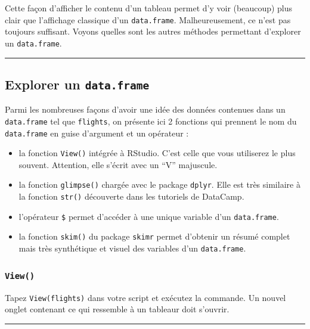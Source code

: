 \documentclass[a4paperpaper,]{article}
\providecommand{\tightlist}{%
  \setlength{\itemsep}{0pt}\setlength{\parskip}{0pt}}
\begin{document}
Cette façon d'afficher le contenu d'un tableau permet d'y voir (beaucoup) plus clair que l'affichage classique d'un \texttt{data.frame}. Malheureusement, ce n'est pas toujours suffisant. Voyons quelles sont les autres méthodes permettant d'explorer un \texttt{data.frame}.

\begin{center}\rule{0.5\linewidth}{\linethickness}\end{center}

\hypertarget{explorer-un-data.frame}{%
\subsection{\texorpdfstring{Explorer un \texttt{data.frame}}{Explorer un data.frame}}\label{explorer-un-data.frame}}

Parmi les nombreuses façons d'avoir une idée des données contenues dans un \texttt{data.frame} tel que \texttt{flights}, on présente ici 2 fonctions qui prennent le nom du \texttt{data.frame} en guise d'argument et un opérateur :

\begin{itemize}
\tightlist
\item
  la fonction \texttt{View()} intégrée à RStudio. C'est celle que vous utiliserez le plus souvent. Attention, elle s'écrit avec un ``V'' majuscule.
\item
  la fonction \texttt{glimpse()} chargée avec le package \texttt{dplyr}. Elle est très similaire à la fonction \texttt{str()} découverte dans les tutoriels de DataCamp.
\item
  l'opérateur \texttt{\$} permet d'accéder à une unique variable d'un \texttt{data.frame}.
\item
  la fonction \texttt{skim()} du package \texttt{skimr} permet d'obtenir un résumé complet mais très synthétique et visuel des variables d'un \texttt{data.frame}.
\end{itemize}

\hypertarget{View}{%
\subsubsection{\texorpdfstring{\texttt{View()}}{View()}}\label{View}}

Tapez \texttt{View(flights)} dans votre script et exécutez la commande. Un nouvel onglet contenant ce qui ressemble à un tableaur doit s'ouvrir.

\begin{center}\rule{0.5\linewidth}{\linethickness}\end{center}
\end{document}
